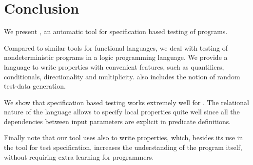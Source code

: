 
\section{Conclusion}
\label{sec:conclusion}



We present \plqc{}, an automatic tool for specification based
testing of \Prolog{} programs.
%


Compared to similar tools for functional languages, we deal with testing
of nondeterministic programs in a logic programming language.
%
We provide a language to write properties with convenient features,
such as quantifiers, conditionals, directionality and multiplicity.
%
\plqc{} also includes the notion of random test-data generation.
%


We show that specification based testing works extremely well for
\Prolog.
%
The relational nature of the language allows to specify local properties
quite well since all the dependencies between input parameters are explicit in
predicate definitions.


Finally note that our tool uses \Prolog{} also to write properties, which,
besides its use in the tool for test specification, increases the
understanding of the program itself, without requiring extra learning for
\Prolog{} programmers.
